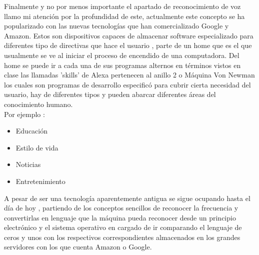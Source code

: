\documentclass[a4paper, 12pt]{article}
\begin{document}
Finalmente y no por menos importante el apartado de reconocimiento de voz llamo mi atenci\'on por la profundidad de este, actualmente este concepto se ha popularizado con las nuevas tecnolog\'ias que han comercializado Google y Amazon. Estos son dispositivos capaces de almacenar software especializado para diferentes tipo de directivas que hace el usuario , parte de un home que es el que usualmente se ve al iniciar el proceso de encendido de una computadora. Del home se puede ir a cada una de sus programas alternos en t\'erminos vistos en clase las llamadas 'skills' de Alexa pertenecen al anillo 2 o M\'aquina Von Newman los cuales son programas de desarrollo especific\'o para cubrir cierta necesidad del usuario, hay de diferentes tipos y pueden abarcar diferentes \'areas del conocimiento humano.   \\                Por ejemplo :  
\begin {itemize}
	\item Educaci\'on
	\item Estilo de vida
	\item Noticias 
	\item Entretenimiento
\end{itemize}

A pesar de ser una tecnolog\'ia aparentemente antigua se sigue ocupando hasta el d\'ia de hoy , partiendo de los conceptos sencillos de reconocer la frecuencia y convertirlas en lenguaje que la m\'aquina pueda reconocer desde un principio electr\'onico y el sistema operativo en cargado de ir comparando el lenguaje de ceros y unos con los respectivos correspondientes almacenados en los grandes servidores con los que cuenta Amazon o Google. 
\end{document}
